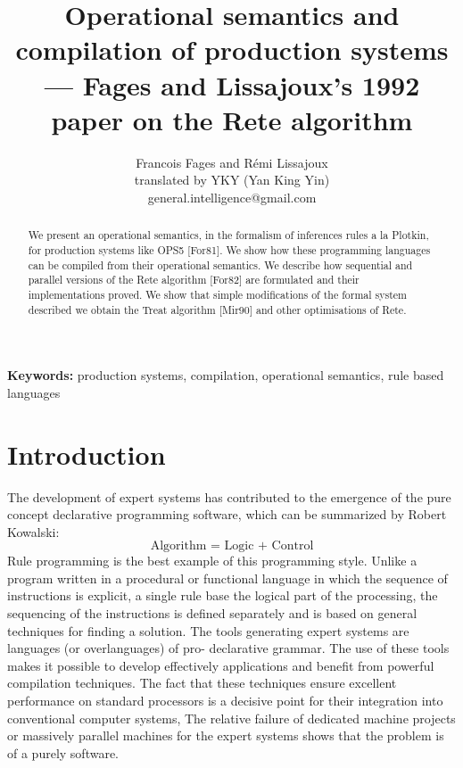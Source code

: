 

\title{Operational semantics and compilation of production systems \\
--- Fages and Lissajoux's 1992 paper on the Rete algorithm}

\author{Francois Fages and R\'{e}mi Lissajoux \\
translated by YKY (Yan King Yin) \\ {\footnotesize general.intelligence@gmail.com}}



	\setlength{\parindent}{0pt}
	\setlength{\parskip}{2.8ex plus0.8ex minus0.8ex}
	
	\maketitle
	
\begin{abstract}
We present an operational semantics, in the formalism of inferences rules a la
Plotkin, for production systems like OPS5 [For81]. We show how these programming
languages can be compiled from their operational semantics. We describe how sequential
and parallel versions of the Rete algorithm [For82] are formulated and their
implementations proved. We show that simple modifications of the formal system described
we obtain the Treat algorithm [Mir90] and other optimisations of Rete.
\end{abstract}

\textbf{Keywords:} production systems, compilation, operational semantics, rule based languages

\section{Introduction}

The development of expert systems has contributed to the emergence of the pure concept
declarative programming software, which can be summarized by Robert Kowalski:
\begin{equation}
\mbox{Algorithm = Logic + Control}
\nonumber
\end{equation}
Rule programming is the best example of this programming style.
Unlike a program written in a procedural or functional language in
which the sequence of instructions is explicit, a single rule base
the logical part of the processing, the sequencing of the instructions is defined
separately and is based on general techniques for finding a solution. The
tools generating expert systems are languages ​​(or overlanguages) of pro-
declarative grammar. The use of these tools makes it possible to develop effectively
applications and benefit from powerful compilation techniques. The fact that
these techniques ensure excellent performance on standard processors is
a decisive point for their integration into conventional computer systems,
The relative failure of dedicated machine projects or massively parallel machines
for the expert systems shows that the problem is of a purely
software.

